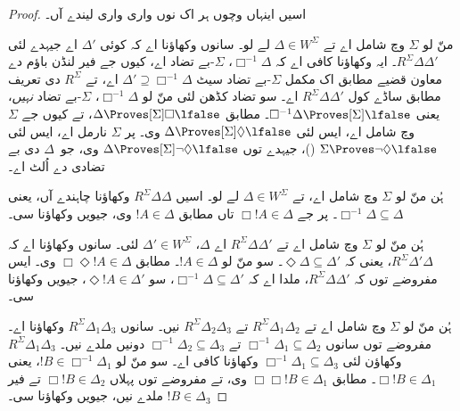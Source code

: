 \documentclass[../../../include/open-logic-section]{subfiles}
\begin{document}
\begin{proof}
  اسیں اینہاں وچوں ہر اک نوں واری واری لیندے آں۔

  منّ لو $\Sigma$ وچ  شامل اے تے $\Delta \in W^\Sigma$ لے لو۔ سانوں وکھاؤنا اے کہ کوئی $\Delta'$ اے جیہدے لئی $R^\Sigma
  \Delta\Delta'$۔ ایہ وکھاؤنا کافی اے کہ $\Box^{-1}\Delta$،
  $\Sigma$-بے تضاد اے، کیوں جے فیر لنڈن باؤم دے معاون قضیے مطابق اک
  مکمل $\Sigma$-بے تضاد سیٹ $\Delta' \supseteq
  \Box^{-1}\Delta$ اے، تے $R^\Sigma$ دی تعریف
  مطابق ساڈے کول
  $R^\Sigma \Delta\Delta'$ اے۔ سو تضاد کڈھن لئی منّ لو
  $\Box^{-1}\Delta$، $\Sigma$-بے تضاد \emph{نہیں}، یعنی
  $\Box^{-1}\Delta \Proves[\Sigma] \lfalse$۔  مطابق
  $\Delta \Proves[\Sigma] \Box\lfalse$، تے کیوں جے $\Sigma$ وچ
   شامل اے، ایس لئی $\Delta \Proves[\Sigma] \Diamond\lfalse$ وی۔ پر $\Sigma$
  نارمل اے، ایس لئی $\Sigma \Proves \lnot\Diamond \lfalse$
  ()، جیہدے توں $\Delta
  \Proves[\Sigma] \lnot\Diamond \lfalse$ وی، جو~$\Delta$ دی بے تضادی دے اُلٹ اے۔

  ہُن منّ لو $\Sigma$ وچ  شامل اے، تے $\Delta \in
  W^\Sigma$ لے لو۔ اسیں $R^\Sigma \Delta\Delta$ وکھاؤنا چاہندے آں،
  یعنی
  $\Box^{-1}\Delta \subseteq \Delta$۔ پر جے $\Box!A \in \Delta$ تاں
   مطابق $!A \in \Delta$ وی، جیویں وکھاؤنا سی۔

  ہُن منّ لو $\Sigma$ وچ  شامل اے تے $R^\Sigma
  \Delta\Delta'$ اے $\Delta$، $\Delta' \in W^\Sigma$ لئی۔ سانوں وکھاؤنا اے کہ $R^\Sigma \Delta'\Delta$، یعنی کہ
  $\Diamond\Delta \subseteq \Delta'$۔ سو منّ لو $!A \in \Delta$۔
   مطابق $\Box\Diamond!A \in \Delta$ وی۔ ایس مفروضے توں کہ
  $R^\Sigma \Delta\Delta'$، ملدا اے کہ $\Box^{-1}\Delta
  \subseteq \Delta'$، سو $\Diamond!A \in \Delta'$، جیویں وکھاؤنا سی۔

  ہُن منّ لو $\Sigma$ وچ  شامل اے تے $R^\Sigma
  \Delta_1\Delta_2$ تے $R^\Sigma \Delta_2\Delta_3$ نیں۔ سانوں
  $R^\Sigma \Delta_1\Delta_3$ وکھاؤنا اے۔ مفروضے توں سانوں $\Box^{-1}\Delta_1
  \subseteq \Delta_2$ تے $\Box^{-1}\Delta_2 \subseteq \Delta_3$ دونیں ملدے نیں۔
  $R^\Sigma \Delta_1\Delta_3$ وکھاؤن لئی
  $\Box^{-1}\Delta_1 \subseteq \Delta_3$ وکھاؤنا کافی اے۔ سو منّ لو $!B \in
  \Box^{-1}\Delta_1$، یعنی $\Box!B \in \Delta_1$۔  مطابق
  $\Box\Box!B \in \Delta_1$ وی، تے مفروضے توں پہلاں
  $\Box!B \in \Delta_2$ تے فیر $!B \in \Delta_3$ ملدے نیں، جیویں وکھاؤنا سی۔


\end{proof}
\end{document}
